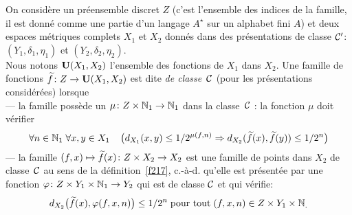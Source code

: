 \begin{fdefinition}\label{f229}

On considère un préensemble discret  $Z$  (c'est l'ensemble des indices de 
la famille, il est donné comme une partie d'un langage  $A^{\star}$  sur un alphabet fini  $A$)  et deux espaces métriques complets  $X_1$  et  $X_2$  donnés dans  des présentations de classe  ${{\cal C}}'$:   $(Y_1,\delta_1,\eta_1)$  et  $(Y_2,\delta_2,\eta_2)$.\\  
Nous notons  ${\bf U}(X_1,X_2)$  l'ensemble des fonctions \unicos de  $X_1$  dans  $X_2$.  
Une famille de fonctions \unicos $\widetilde{f}\colon Z\rightarrow 
{\bf U}(X_1,X_2)$ est dite {\em \uni de classe~${{\cal C}}$} (pour les présentations considérées) lorsque\\
--- la famille possède un \mcu  $\mu \colon  Z \times \mathbb {N}_1 \rightarrow\mathbb {N}_1$   
dans la classe~${{\cal C}}$ :   la fonction  $\mu$  doit vérifier     
\[
\forall  n \in \mathbb {N}_1\;\forall  x,
y \in X_1 \;\; \; \;  \big(d_{X_1}(x,y) \leq 1/2^{\mu(f,n)} \Rightarrow 
d_{X_2}(\widetilde{f}(x),\widetilde{f}(y)) \leq 1/2^n \big)
\] 
--- la famille   $(f,x) \mapsto \widetilde{f}(x) \colon  Z \times X_2 \rightarrow
X_2$  est une famille de points dans  $X_2$  de classe~${{\cal C}}$   au sens de la 
définition~\ref{f217}, c.-à-d. qu'elle est présentée par une fonction    
$\varphi\colon  Z \times Y_1 \times \mathbb {N}_1 \rightarrow Y_2 $    qui est de classe  
${{\cal C}}$   et qui vérifie:
$$d_{X_2}\big(\widetilde{f}(x),\varphi(f,x,n)\big) \leq 1/2^n \; \hbox{pour tout} \; 
(f, x, n) \in Z \times Y_1 \times \mathbb {N}_.$$
\end{fdefinition}

